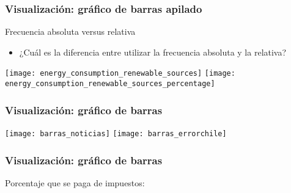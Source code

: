 \documentclass[table]{beamer}
\begin{document}
\begin{frame}
    \frametitle{Visualización: gráfico de barras apilado}
    \begin{block}{Frecuencia absoluta versus relativa}
        \begin{itemize}
            \item ¿Cuál es la diferencia entre utilizar la frecuencia absoluta y la relativa?
        \end{itemize}
    \end{block}
    \begin{center}
        \texttt{[image: energy\_consumption\_renewable\_sources]}
        \texttt{[image: energy\_consumption\_renewable\_sources\_percentage]}
    \end{center}
\end{frame}

\begin{frame}
    \frametitle{Visualización: gráfico de barras}
    \begin{center}
        \texttt{[image: barras\_noticias]}
        \texttt{[image: barras\_errorchile]}
    \end{center}
\end{frame}

\begin{frame}
    \frametitle{Visualización: gráfico de barras}
    Porcentaje que se paga de impuestos:
    \begin{center}
    \end{center}
\end{frame}
\end{document}
